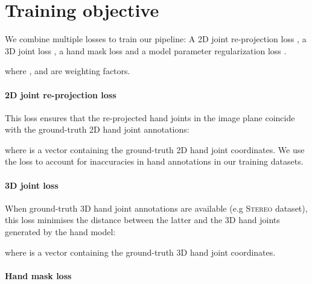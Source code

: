 \documentclass[10pt,twocolumn,letterpaper]{article}
\begin{document}
\section{Training objective}

We combine multiple losses to train our pipeline: A 2D joint re-projection loss , a 3D joint loss , a hand mask loss  and a model parameter regularization loss .

where ,  and  are weighting factors. 

\paragraph{2D joint re-projection loss}
\vspace{-10pt} 
This loss ensures that the re-projected hand joints in the image plane coincide with the ground-truth 2D hand joint annotations:  

where  is a vector containing the ground-truth 2D hand joint coordinates. We use the  loss to account for inaccuracies in hand annotations in our training datasets. 

\paragraph{3D joint loss} 
\vspace{-10pt}
When ground-truth 3D hand joint annotations are available (e.g \textsc{Stereo} dataset), this loss minimises the distance between the latter and the 3D hand joints generated by the hand model:

where  is a vector containing the ground-truth 3D hand joint coordinates. 


\paragraph{Hand mask loss}
\vspace{-10pt}
\end{document}
